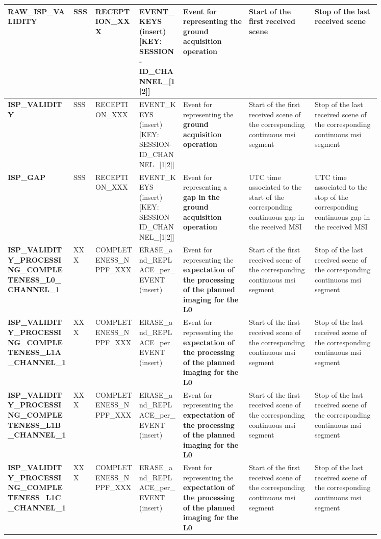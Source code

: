 \begin{landscape}
\begin{longtable}{|M{0.15\linewidth}|M{0.05\linewidth}|M{0.10\linewidth}|M{0.10\linewidth}|M{0.15\linewidth}|M{0.15\linewidth}|M{0.15\linewidth}|}
\textbf{RAW\_ISP\_VALIDITY} & SSS & \- RECEPTION\_XXX & EVENT\_KEYS (insert) [KEY: SESSION-ID\_CHANNEL\_[1|2]] & Event for representing the \textbf{ground acquisition operation} & Start of the first received scene & Stop of the last received scene \\ \hline
\textbf{ISP\_VALIDITY} & SSS & \- RECEPTION\_XXX & EVENT\_KEYS (insert) [KEY: SESSION-ID\_CHANNEL\_[1|2]] & Event for representing the \textbf{ground acquisition operation} & Start of the first received scene of the corresponding continuous \acrshort{msi} segment & Stop of the last received scene of the corresponding continuous \acrshort{msi} segment \\ \hline
\textbf{ISP\_GAP} & SSS & \- RECEPTION\_XXX & EVENT\_KEYS (insert) [KEY: SESSION-ID\_CHANNEL\_[1|2]] & Event for representing a \textbf{gap in the ground acquisition operation} & UTC time associated to the start of the corresponding continuous gap in the received MSI & UTC time associated to the stop of the corresponding continuous gap in the received MSI \\ \hline
\textbf{ISP\_VALIDITY\_PROCESSING\_COMPLETENESS\_L0\_CHANNEL\_1} & XXX & \- COMPLETENESS\_NPPF\_XXX & ERASE\_and\_REPLACE\_per\_EVENT (insert) & Event for representing the \textbf{expectation of the processing of the planned imaging for the L0} & Start of the first received scene of the corresponding continuous \acrshort{msi} segment & Stop of the last received scene of the corresponding continuous \acrshort{msi} segment \\ \hline
\textbf{ISP\_VALIDITY\_PROCESSING\_COMPLETENESS\_L1A\_CHANNEL\_1} & XXX & \- COMPLETENESS\_NPPF\_XXX & ERASE\_and\_REPLACE\_per\_EVENT (insert) & Event for representing the \textbf{expectation of the processing of the planned imaging for the L0} & Start of the first received scene of the corresponding continuous \acrshort{msi} segment & Stop of the last received scene of the corresponding continuous \acrshort{msi} segment \\ \hline
\textbf{ISP\_VALIDITY\_PROCESSING\_COMPLETENESS\_L1B\_CHANNEL\_1} & XXX & \- COMPLETENESS\_NPPF\_XXX & ERASE\_and\_REPLACE\_per\_EVENT (insert) & Event for representing the \textbf{expectation of the processing of the planned imaging for the L0} & Start of the first received scene of the corresponding continuous \acrshort{msi} segment & Stop of the last received scene of the corresponding continuous \acrshort{msi} segment \\ \hline
\textbf{ISP\_VALIDITY\_PROCESSING\_COMPLETENESS\_L1C\_CHANNEL\_1} & XXX & \- COMPLETENESS\_NPPF\_XXX & ERASE\_and\_REPLACE\_per\_EVENT (insert) & Event for representing the \textbf{expectation of the processing of the planned imaging for the L0} & Start of the first received scene of the corresponding continuous \acrshort{msi} segment & Stop of the last received scene of the corresponding continuous \acrshort{msi} segment \\ \hline

\end{longtable}
\end{landscape}
